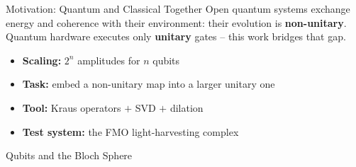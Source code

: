 \begin{frame}[t]{}
\noindent\hspace*{\sidemargin}%
\begin{postercolumn}

  \begin{block}{Motivation: Quantum and Classical Together}
    Open quantum systems exchange energy and coherence with their
    environment: their evolution is \textbf{non-unitary}. Quantum hardware
    executes only \textbf{unitary} gates -- this work bridges that gap.

    \smallskip

    \begin{itemize}\tightlist
      \item \textbf{Scaling:} $2^n$ amplitudes for $n$ qubits
      \item \textbf{Task:} embed a non-unitary map into a larger unitary one
      \item \textbf{Tool:} Kraus operators $+$ SVD $+$ dilation
      \item \textbf{Test system:} the FMO light-harvesting complex
    \end{itemize}
  \end{block}

  \begin{block}{Qubits and the Bloch Sphere}


\end{block}
\end{postercolumn}
\end{frame}
